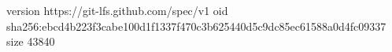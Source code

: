 version https://git-lfs.github.com/spec/v1
oid sha256:ebcd4b223f3cabe100d1f1337f470c3b625440d5c9dc85ec61588a0d4fc09337
size 43840
